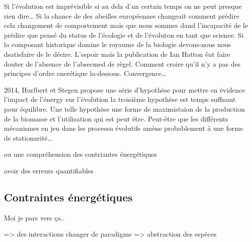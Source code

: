 Si l'évolution est imprévisible si au dela d'un certain temps on ne peut
presque rien dire\ldots{} Si la chance de des abeilles européennes
changeait comment prédire cela changement de comportement mais que nous
sommes dand l'incapacité de le prédire que pensé du status de l'écologie
et de l'évoluton en tant que science. Si la composant historique domine
le royaume de la biologie devons-nous nous dsatisfaire de le décire.
L'espoir mais la publication de Ian Hatton êut faire douter de l'absence
de l'absecmed de règel. Comment croire qu'il n'y a pas des principes
d'ordre enerétique la-dessous. Convergence\ldots{}

2014, Hurlbert et Stegen propose une série d'hypothèse pour mettre en
évidence l'impact de l'énergy sur l'évolution la troisième hypothèse est
temps suffisant pour équilibre. Une telle hypothèse une forme de
maximistaion de la production de la biomasse et l'utilisation qui est
peut être. Peut-être que les différents mécanismes en jeu dans les
processu évolutifs amène probablement à une forme de
stationarité\ldots{}

ou une compréhension des contriantes énergétiques

avoir des erreurs quantifiables

\subsection*{Contraintes
énergétiques}\label{contraintes-uxe9nerguxe9tiques}

Moi je pars vers ça..

=\textgreater{} des interactions changer de paradigme =\textgreater{}
abstraction des espèces

